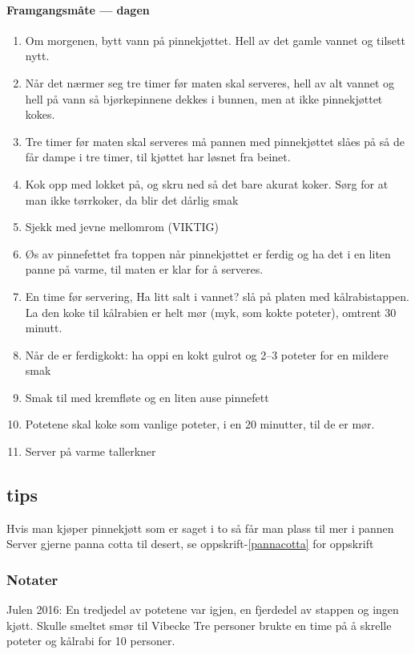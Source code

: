 \paragraph{Framgangsmåte --- dagen}
\begin{enumerate}[noitemsep]
  \item Om morgenen, bytt vann på pinnekjøttet. Hell av det gamle vannet og tilsett nytt.
  \item Når det nærmer seg tre timer før maten skal serveres, hell av alt vannet og hell på vann så bjørkepinnene dekkes i bunnen, men at ikke pinnekjøttet kokes.
  \item Tre timer før maten skal serveres må pannen med pinnekjøttet slåes på så de får dampe i tre timer, til kjøttet har løsnet fra beinet.
  \item Kok opp med lokket på, og skru ned så det bare akurat koker. Sørg for at man ikke tørrkoker, da blir det dårlig smak
  \item Sjekk med jevne mellomrom (VIKTIG)
  \item Øs av pinnefettet fra toppen når pinnekjøttet er ferdig og ha det i en liten panne på varme, til maten er klar for å serveres.

  \item En time før servering, Ha litt salt i vannet?  slå på platen med kålrabistappen. La den koke til kålrabien er helt mør (myk, som kokte poteter), omtrent 30 minutt.
  \item Når de er ferdigkokt: ha oppi en kokt gulrot og 2--3 poteter for en mildere smak
  \item Smak til med kremfløte og en liten ause pinnefett

  \item Potetene skal koke som vanlige poteter, i en 20 minutter, til de er mør.

  \item Server på varme tallerkner
\end{enumerate}

\subsection{tips}
Hvis man kjøper pinnekjøtt som er saget i to så får man plass til mer i pannen
Server gjerne panna cotta til desert, se oppskrift-\ref{pannacotta} for oppskrift

\subsubsection{Notater}
Julen 2016: En tredjedel av potetene var igjen, en fjerdedel av stappen og ingen kjøtt. Skulle smeltet smør til Vibecke
Tre personer brukte en time på å skrelle poteter og kålrabi for 10 personer.


